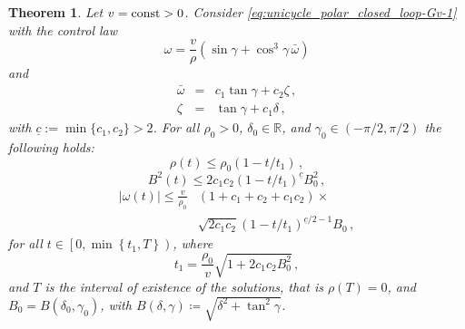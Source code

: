 \documentclass[letterpaper, 10 pt, conference]{ieeeconf}  %
\newtheorem{theorem}{Theorem}
\begin{document}

\begin{theorem}%
\label{thm:Dubins-FT-stabilize6}
Let $v=\mbox{\rm const}>0$. Consider \eqref{eq:unicycle_polar_closed_loop-Gv-1}
with the control law 
\begin{equation}
    \omega =\frac{v}{\rho} \left(\sin\gamma +\cos^3\gamma \, \bar\omega\right)
\end{equation}
and
\begin{subequations}
\label{eq-third-controller6}
\begin{eqnarray}
\label{eq-third-controller26}
\bar\omega &=& c_1\tan\gamma+c_2\zeta \,,
\\
\label{eq-third-controller36}
\zeta &=& \tan\gamma + c_1\delta\,,
\end{eqnarray}
\end{subequations}
with $\underline c :=\min\{c_1,c_2\} > 2$. 
For all $\rho_0>0$, $\delta_0\in\mathbb{R}$, and $\gamma_0\in(-\pi/2,\pi/2)$ the following holds:
\begin{equation}
\label{eq2-rho-bound6}
\rho(t)\leq \rho_0 (1-t/t_1) \,,
\end{equation}
\begin{equation}
\label{eq2-deltan-bound6}
B^2(t) \leq 
2c_1 c_2 ({1-t/t_1})^{\underline c}
B_0^2 \,,
\end{equation}
\begin{align}
|\omega(t)| \leq \frac{v}{\rho_0}&(1+c_1 +c_2+c_1c_2)\times \nonumber \\ &\sqrt{2c_1 c_2}  (1-t/t_1)^{\underline c/2 -1} \label{eq2-omega(t)-bound6}
B_0 \,,
\end{align}
for all $t\in\left[0, \min\left\{t_1,T\right\} \right)$, where 
\begin{equation}
\label{eq-t1N1beta16}
t_1 =\frac{\rho_0}{v}{\sqrt{1+2c_1 c_2B_0^2}}\,,
\end{equation}
and $T$ is the interval of existence of the solutions, that is $\rho(T)=0$, and $B_0 = B(\delta_0,\gamma_0)$, with $B(\delta,\gamma) \coloneqq \sqrt{\delta^2 + \tan^2\gamma}$.
\end{theorem}
\end{document}
